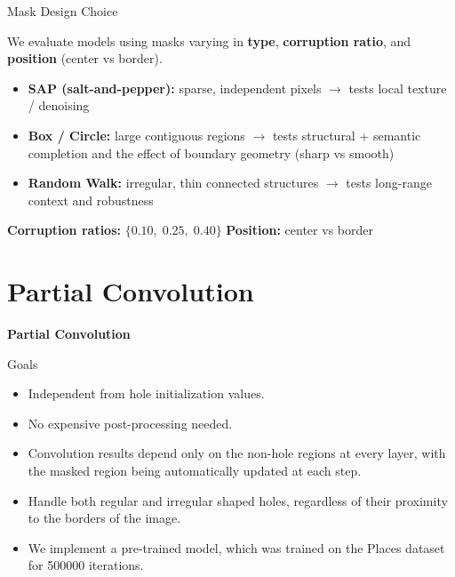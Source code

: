 \documentclass[aspectratio=43]{beamer}
\begin{document}
	\begin{frame}{Mask Design Choice}
		
		We evaluate models using masks varying in \textbf{type}, \textbf{corruption ratio}, and \textbf{position} (center vs border).
		
		\vspace{0.2cm}
		
		\begin{itemize}
			\item \textbf{SAP (salt-and-pepper):} sparse, independent pixels $\rightarrow$ tests local texture / denoising
			
			\item \textbf{Box / Circle:} large contiguous regions $\rightarrow$ tests structural + semantic completion and the effect of boundary geometry (sharp vs smooth)
			
			\item \textbf{Random Walk:} irregular, thin connected structures $\rightarrow$ tests long-range context and robustness
		\end{itemize}
		
		\vspace{0.2cm}
		
		\textbf{Corruption ratios:} $\{0.10,\;0.25,\;0.40\}$ \hfill
		\textbf{Position:} center vs border
		
	\end{frame}
	
	
	
	\section{Partial Convolution}
	\begin{frame}
		\begin{center}
			\Huge{\textbf{Partial Convolution}}
		\end{center}
	\end{frame}
	
	
	\begin{frame}{Goals}
		\begin{itemize}
			\item Independent from hole initialization values.
			\item No expensive post-processing needed.
			\item Convolution results depend only on the non-hole regions at every layer, with the masked region being automatically updated at each step.
			\item Handle both regular and irregular shaped holes, regardless of their proximity to the borders of the image.
			\item We implement a pre-trained model, which was trained on the Places dataset for 500000 iterations.
		\end{itemize}
	\end{frame}
	
\end{document}
